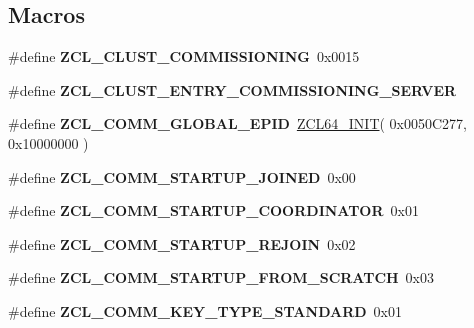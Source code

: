 \subsection*{Macros}
\begin{DoxyCompactItemize}
\item 
\hypertarget{group__zcl__commissioning_ga547cd138961d72d75ec09224e7777ed7}{\#define {\bfseries Z\-C\-L\-\_\-\-C\-L\-U\-S\-T\-\_\-\-C\-O\-M\-M\-I\-S\-S\-I\-O\-N\-I\-N\-G}~0x0015}\label{group__zcl__commissioning_ga547cd138961d72d75ec09224e7777ed7}

\item 
\#define {\bfseries Z\-C\-L\-\_\-\-C\-L\-U\-S\-T\-\_\-\-E\-N\-T\-R\-Y\-\_\-\-C\-O\-M\-M\-I\-S\-S\-I\-O\-N\-I\-N\-G\-\_\-\-S\-E\-R\-V\-E\-R}
\item 
\hypertarget{group__zcl__commissioning_ga7e7f7c1abfa0734e79a0e1dbfc053faa}{\#define {\bfseries Z\-C\-L\-\_\-\-C\-O\-M\-M\-\_\-\-G\-L\-O\-B\-A\-L\-\_\-\-E\-P\-I\-D}~\hyperlink{group__zcl__64_ga8e855e53988a32f4428ceacce4f9870c}{Z\-C\-L64\-\_\-\-I\-N\-I\-T}( 0x0050\-C277, 0x10000000 )}\label{group__zcl__commissioning_ga7e7f7c1abfa0734e79a0e1dbfc053faa}

\item 
\hypertarget{group__zcl__commissioning_ga65e717b887be7667a9c003fd3dfffcdd}{\#define {\bfseries Z\-C\-L\-\_\-\-C\-O\-M\-M\-\_\-\-S\-T\-A\-R\-T\-U\-P\-\_\-\-J\-O\-I\-N\-E\-D}~0x00}\label{group__zcl__commissioning_ga65e717b887be7667a9c003fd3dfffcdd}

\item 
\hypertarget{group__zcl__commissioning_gadd01d1d0543cc7329332fe06ceba4e48}{\#define {\bfseries Z\-C\-L\-\_\-\-C\-O\-M\-M\-\_\-\-S\-T\-A\-R\-T\-U\-P\-\_\-\-C\-O\-O\-R\-D\-I\-N\-A\-T\-O\-R}~0x01}\label{group__zcl__commissioning_gadd01d1d0543cc7329332fe06ceba4e48}

\item 
\hypertarget{group__zcl__commissioning_gac6430290e70952064a72a9cbd5136081}{\#define {\bfseries Z\-C\-L\-\_\-\-C\-O\-M\-M\-\_\-\-S\-T\-A\-R\-T\-U\-P\-\_\-\-R\-E\-J\-O\-I\-N}~0x02}\label{group__zcl__commissioning_gac6430290e70952064a72a9cbd5136081}

\item 
\hypertarget{group__zcl__commissioning_gaa3914948a2024dab2b0ae5f3ff8ae5e7}{\#define {\bfseries Z\-C\-L\-\_\-\-C\-O\-M\-M\-\_\-\-S\-T\-A\-R\-T\-U\-P\-\_\-\-F\-R\-O\-M\-\_\-\-S\-C\-R\-A\-T\-C\-H}~0x03}\label{group__zcl__commissioning_gaa3914948a2024dab2b0ae5f3ff8ae5e7}

\item 
\hypertarget{group__zcl__commissioning_gad7f5d4706a3fa18605030c3811076c29}{\#define {\bfseries Z\-C\-L\-\_\-\-C\-O\-M\-M\-\_\-\-K\-E\-Y\-\_\-\-T\-Y\-P\-E\-\_\-\-S\-T\-A\-N\-D\-A\-R\-D}~0x01}\label{group__zcl__commissioning_gad7f5d4706a3fa18605030c3811076c29}


\end{DoxyCompactItemize}
